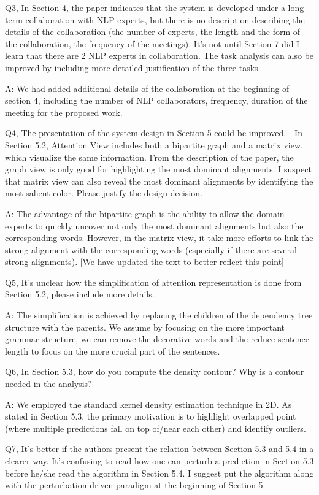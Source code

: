 Q3, In Section 4, the paper indicates that the system is developed under a long-term collaboration with NLP experts, but there is no description describing the details of the collaboration (the number of experts, the length and the form of the collaboration, the frequency of the meetings). It's not until Section 7 did I learn that there are 2 NLP experts in collaboration. The task analysis can also be improved by including more detailed justification of the three tasks.

A: We had added additional details of the collaboration at the beginning of section 4, including the number of NLP collaborators, frequency, duration of the meeting for the proposed work.

Q4, The presentation of the system design in Section 5 could be improved.
- In Section 5.2, Attention View includes both a bipartite graph and a matrix view, which visualize the same information. From the description of the paper, the graph view is only good for highlighting the most dominant alignments. I suspect that matrix view can also reveal the most dominant alignments by identifying the most salient color. Please justify the design decision.

A: The advantage of the bipartite graph is the ability to allow the domain experts to quickly uncover not only the most dominant alignments but also the corresponding words. However, in the matrix view, it take more efforts to link the strong alignment with the corresponding words (especially if there are several strong alignments). [We have updated the text to better reflect this point]

Q5, It's unclear how the simplification of attention representation is done from Section 5.2, please include more details.

A: The simplification is achieved by replacing the children of the dependency tree structure with the parents. We assume by focusing on the more important grammar structure, we can remove the decorative words and the reduce sentence length to focus on the more crucial part of the sentences.

Q6, In Section 5.3, how do you compute the density contour? Why is a contour needed in the analysis?

A: We employed the standard kernel density estimation technique in 2D. As stated in Section 5.3, the primary motivation is to highlight overlapped point (where multiple predictions fall on top of/near each other) and identify outliers.

Q7, It's better if the authors present the relation between Section 5.3 and 5.4 in a clearer way. It's confusing to read how one can perturb a prediction in Section 5.3 before he/she read the algorithm in Section 5.4. I suggest put the algorithm along with the perturbation-driven paradigm at the beginning of Section 5.

